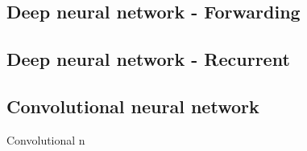 \subsection{Deep neural network - Forwarding}
\subsection{Deep neural network - Recurrent}
\subsection{Convolutional neural network}
Convolutional n